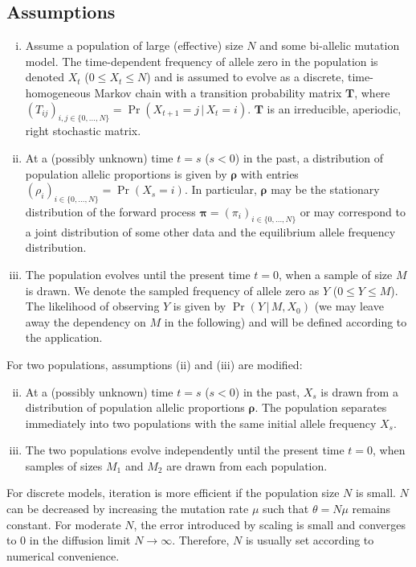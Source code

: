 \documentclass[preprint]{elsarticle}
\newcommand{\bs}[1]{\ensuremath{\boldsymbol{#1}}}
\newcommand\given{{\,|\,}}
\newcommand\x[1]{\ensuremath{X_{#1}}}
\newcommand\y{\ensuremath{Y}}
\newcommand\s{\ensuremath{s}}
\begin{document}
\subsection{Assumptions}\label{section:assumptions}
\begin{enumerate}[(i)]
\item Assume a population of large (effective) size $N$ and some bi-allelic mutation model. The time-dependent frequency of allele zero in the population is denoted $\x{t}$ ($0 \le \x{t} \le N$) and is assumed to evolve as a discrete, time-homogeneous Markov chain with a transition probability matrix $\mathbf{T}$, where $(T_{ij})_{i,j \in \{0, \ldots, N\}} = \Pr(\x{t+1}=j \given \x{t}=i)$. $\mathbf{T}$ is an irreducible, aperiodic, right stochastic matrix.
\item At a (possibly unknown) time $t=\s$ ($\s<0$) in the past, a distribution of population allelic proportions is given by $\bs{\rho}$ with entries $(\rho_{i})_{i \in \{0, \ldots, N\}} = \Pr(\x{\s}=i)$.  In particular, $\bs{\rho}$ may be the stationary distribution of the forward process $\bs{\pi}=(\pi_i)_{i \in \{0, \ldots, N\}}$ or may correspond to a joint distribution of some other data and the equilibrium allele frequency distribution. 
\item The population evolves until the present time $t=0$, when a sample of size $M$ is drawn.  We denote the sampled frequency of allele zero as $\y$ ($0 \le \y \le M$). The likelihood of observing $\y$ is given by $\Pr(\y \given M, \x{0})$ (we may leave away the dependency on $M$ in the following) and will be defined according to the application.
\end{enumerate}

For two populations, assumptions (ii) and (iii) are modified:
\begin{enumerate}[(i)]
\setcounter{enumi}{1}
\item At a (possibly unknown) time $t=\s$ ($\s<0$) in the past,  $\x{\s}$ is drawn from a distribution of population allelic proportions $\bs{\rho}$. The population separates immediately into two populations with the same initial allele frequency $\x{\s}$. 
\item The two populations evolve independently until the present time $t=0$, when samples of sizes $M_1$ and $M_2$ are drawn from each population.
\end{enumerate}

For discrete models, iteration is more efficient if the population size $N$ is small. $N$ can be decreased by increasing the mutation rate $\mu$ such that $\theta=N \mu$ remains constant. For moderate $N$, the error introduced by scaling is small and converges to $0$ in the diffusion limit $N \to \infty$. Therefore, $N$ is usually set according to numerical convenience. %
\end{document}
